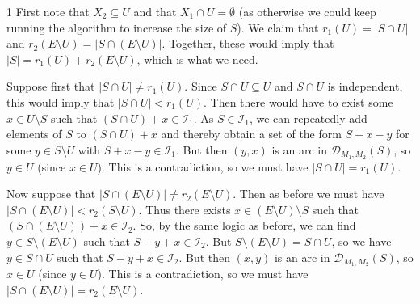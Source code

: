 \documentclass[12pt]{article}
\begin{document}
\begin{proof_of}{1} First note that $X_2 \subseteq U$ and that $X_1
\cap U = \emptyset$ (as otherwise we could keep running the algorithm
to increase the size of $S$). We claim that $r_1(U) = |S \cap U|$ and
$r_2(E \setminus U) = |S \cap (E \setminus U)|$. Together, these
would imply that $|S| = r_1(U)+r_2(E \setminus U)$, which is what we
need.

Suppose first that $|S \cap U| \neq r_1(U)$. Since $S \cap U \subseteq
U$ and $S \cap U$ is independent, this would imply that $|S \cap U| <
r_1(U)$. Then there would have to exist some $x \in U \setminus S$
such that $(S \cap U)+x \in \mathcal{I}_1$. As $S\in \mathcal{I}_1$,
we can repeatedly add elements of $S$ to $(S \cap U)+x$ and thereby
obtain a set of the form $S+x-y$ for some $y \in S \setminus U$ with
$S+x-y\in \mathcal{I}_1$. But then $(y,x)$ is an arc in
$\mathcal{D}_{M_1,M_2}(S)$, so $y \in U$ (since $x \in U$). This is a
contradiction, so we must have $|S \cap U| = r_1(U)$.

Now suppose that $|S \cap (E \setminus U)| \neq r_2(E \setminus
U)$. Then as before we must have $|S \cap (E \setminus U)| < r_2(S
\setminus U)$. Thus there exists $x \in (E \setminus U) \setminus
S$ such that $(S \cap (E \setminus U)) + x \in \mathcal{I}_2$. So, by
the same logic as before, we can find $y \in S \setminus (E
\setminus U)$ such that $S-y+x \in \mathcal{I}_2$. But $S \setminus
(E \setminus U) = S \cap U$, so we have $y \in S \cap U$ such that
$S-y+x \in \mathcal{I}_2$. But then $(x,y)$ is an arc in
$\mathcal{D}_{M_1,M_2}(S)$, so $x \in U$ (since $y \in U$). This is a
contradiction, so we must have $|S \cap (E \setminus U)| = r_2(E
\setminus U)$.  \end{proof_of}


\end{document}
